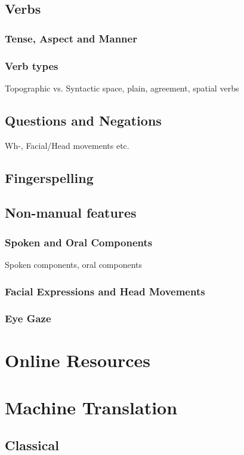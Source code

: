 \documentclass[12pt]{ociamthesis}  %
\begin{document}
\subsection{Verbs}
\subsubsection{Tense, Aspect and Manner}
\subsubsection{Verb types}
Topographic vs. Syntactic space, plain, agreement, spatial verbs

\subsection{Questions and Negations}
Wh-, Facial/Head movements etc.
\subsection{Fingerspelling}

\subsection{Non-manual features}
\subsubsection{Spoken and Oral Components}
Spoken components, oral components
\subsubsection{Facial Expressions and Head Movements}
\subsubsection{Eye Gaze}

\section{Online Resources}

\section{Machine Translation}
\label{machine translation}
\subsection{Classical}
\end{document}
